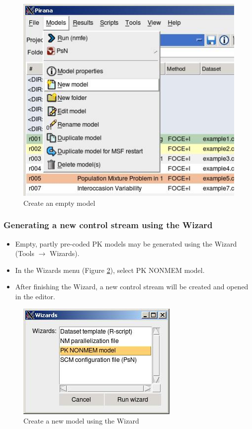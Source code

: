\begin{figure}[h] \centering
    \includegraphics[scale=.5]{images/working_1.jpg}
    \caption{Create an empty model\label{fig:Fig4}}
\end{figure}

\subsubsection*{Generating a new control stream using the Wizard}
\begin{itemize}
\item Empty, partly pre-coded PK models may be generated using the Wizard (Tools $ \rightarrow$ Wizards). 
\item In the Wizards menu (Figure \ref{fig:Fig5}), select PK NONMEM model. 
\item After finishing the Wizard, a new control stream will be created and opened in the editor.
\end{itemize}

\begin{figure}[h] \centering
    \includegraphics[scale=.5]{images/working_2.jpg}
    \caption{Create a new model using the Wizard\label{fig:Fig5}}
\end{figure}


